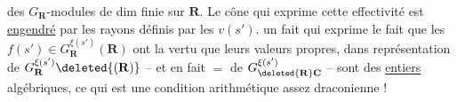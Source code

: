 des $G_{\mathbf R}$-modules de dim finie sur $\mathbf R$. Le cône qui exprime cette effectivité est \uline{engendré} par les  rayons définis par les $v(s')$.  un fait qui exprime  le fait que les  $f(s')\in G_{\mathbf R}^{\xi(s')}(\mathbf R)$ ont la vertu que leurs valeurs propres, dans  représentation de $G_{\mathbf R}^{\xi(s')}\deleted{(\mathbf R)}$ -- et en fait $=$ de $G_{\deleted{\mathbf R}\mathbf C}^{\xi(s')}$ -- sont des \uline{entiers} algébriques, ce qui est une condition arithmétique assez draconienne !
